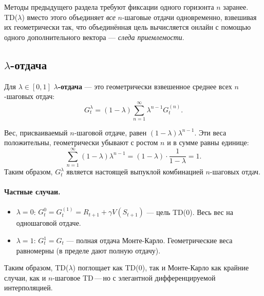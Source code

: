 Методы предыдущего раздела требуют фиксации одного горизонта $n$ заранее.  TD($\lambda$) вместо этого объединяет \emph{все} $n$-шаговые отдачи одновременно, взвешивая их геометрически так, что объединённая цель вычисляется онлайн с помощью одного дополнительного вектора --- \emph{следа приемлемости}.

\subsection{$\lambda$-отдача}

\begin{definition}
\label{def:lambda-return}
Для $\lambda\in[0,1]$ \textbf{$\lambda$-отдача} --- это геометрически взвешенное среднее всех $n$-шаговых отдач:
\begin{equation}
\label{eq:lambda-return}
G_t^\lambda = (1-\lambda)\sum_{n=1}^{\infty}\lambda^{n-1}G_t^{(n)}.
\end{equation}
\end{definition}

Вес, присваиваемый $n$-шаговой отдаче, равен $(1-\lambda)\lambda^{n-1}$.  Эти веса положительны, геометрически убывают с ростом $n$ и в сумме равны единице:
\[
\sum_{n=1}^{\infty}(1-\lambda)\lambda^{n-1} = (1-\lambda)\cdot\frac{1}{1-\lambda} = 1.
\]
Таким образом, $G_t^\lambda$ является настоящей выпуклой комбинацией $n$-шаговых отдач.

\paragraph{Частные случаи.}
\begin{itemize}[leftmargin=*]
  \item $\lambda = 0$: $G_t^0 = G_t^{(1)} = R_{t+1}+\gamma V(S_{t+1})$ --- цель TD(0).  Весь вес на одношаговой отдаче.
  \item $\lambda = 1$: $G_t^1 = G_t$ --- полная отдача Монте-Карло.  Геометрические веса равномерны (в пределе дают полную отдачу).
\end{itemize}
Таким образом, TD($\lambda$) поглощает как TD(0), так и Монте-Карло как крайние случаи, как и $n$-шаговое TD\,---\,но с элегантной дифференцируемой интерполяцией.

